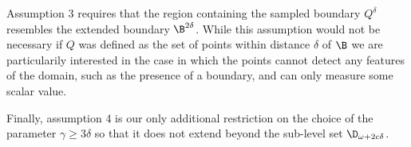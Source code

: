 Assumption 3 requires that the region containing the sampled boundary $Q^\delta$ resembles the extended boundary $\B^{2\delta}$.
While this assumption would not be necessary if $Q$ was defined as the set of points within distance $\delta$ of $\B$ we are particularily interested in the case in which the points cannot detect any features of the domain, such as the presence of a boundary, and can only measure some scalar value.

Finally, assumption 4 is our only additional restriction on the choice of the parameter $\gamma\geq 3\delta$ so that it does not extend beyond the sub-level set $\D_{\omega+2c\delta}$.
